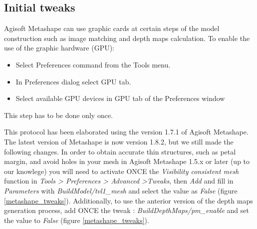 \documentclass[10pt,letter,english]{article}
\begin{document}
\subsection{Initial tweaks}

Agisoft Metashape can use graphic cards at certain steps of the model construction such as image matching and depth maps calculation. To enable the use of the graphic hardware (GPU):

\begin{itemize}
    \item Select Preferences command from the Tools menu.
    \item In Preferences dialog select GPU tab.
    \item Select available GPU devices in GPU tab of the Preferences window
\end{itemize}

This step has to be done only once.



This protocol has been elaborated using the version 1.7.1 of Agisoft Metashape. The latest version of Metashape is now version 1.8.2, but we still made the following changes. In order to obtain accurate thin structures, such as petal margin, and avoid holes in your mesh in Agisoft Metashape 1.5.x or later (up to our knowlege) you will need to activate ONCE the \textit{Visibility consistent mesh} function in \textit{Tools > Preferences > Advanced >Tweaks}, then \textit{Add} and fill in \textit{Parameters} with \textit{BuildModel/tvl1\_mesh} and select the value as \textit{False} (figure \ref{metashape_tweaks}). Additionally, to use the anterior version of the depth maps generation process, add ONCE the tweak : \textit{BuildDepthMaps/pm\_enable} and set the value to \textit{False} (figure \ref{metashape_tweaks}).
\end{document}
